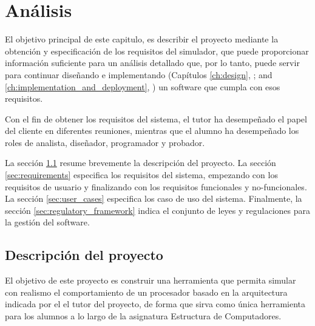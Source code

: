 \chead[]{}
\renewcommand{\headrulewidth}{0.5pt}

\lfoot[]{}
\cfoot[]{}
\rfoot[]{}
\renewcommand{\footrulewidth}{0pt}

\chapter{Análisis}
\label{ch:analysis}

El objetivo principal de este capitulo, es describir el proyecto mediante la obtención y especificación de los requisitos del simulador, que puede proporcionar información suficiente para un análisis detallado que, por lo tanto, puede servir para continuar diseñando e implementando (Capítulos \ref{ch:design}, \textit{}; and \ref{ch:implementation_and_deployment}, \textit{}) un software que cumpla con esos requisitos. 

Con el fin de obtener los requisitos del sistema, el tutor ha desempeñado el papel del cliente en diferentes reuniones, mientras que el alumno ha desempeñado los roles de analista, diseñador, programador y probador.

La sección \ref{sec:project_description} resume brevemente la descripción del proyecto. La sección \ref{sec:requirements} especifica los requisitos del sistema, empezando con los requisitos de usuario y finalizando con los requisitos funcionales y no-funcionales. La sección \ref{sec:user_cases} especifica los caso de uso del sistema. Finalmente, la sección \ref{sec:regulatory_framework} indica el conjunto de leyes y regulaciones para la gestión del software.  

\section{Descripción del proyecto}
\label{sec:project_description}

El objetivo de este proyecto es construir una herramienta que permita simular con realismo el comportamiento de un procesador basado en la arquitectura indicada por el el tutor del proyecto, de forma que sirva como única herramienta para los alumnos a lo largo de la asignatura Estructura de Computadores.

